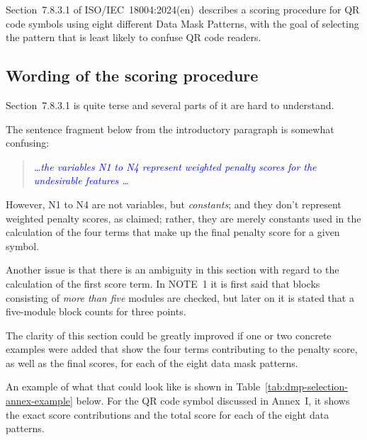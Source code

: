 \documentclass[a4paper,twoside]{article}
\newcommand{\shortstandard}{ISO/IEC~18004}
\newcommand{\standard}{\shortstandard:2024(en)}
\newcommand{\quotestandard}[1]{\textcolor{blue}{\textit{#1}}}
\newcommand{\ddd}{\dots}
\begin{document}
Section~7.8.3.1 of \standard\ describes a scoring procedure for QR code symbols using eight different
Data Mask Patterns, with the goal of selecting the pattern that is least likely to confuse QR code readers.

\subsection{Wording of the scoring procedure}

Section~7.8.3.1 is quite terse and several parts of it are hard to understand.

The sentence fragment below from the introductory paragraph is somewhat confusing:

\begin{quote}
\quotestandard{\ddd the variables N1 to N4 represent weighted penalty scores for the undesirable features \ddd}
\end{quote}

However, N1 to N4 are not variables, but \emph{constants}; and they don't represent weighted penalty
scores, as claimed; rather, they are merely constants used in the calculation of the four terms that make
up the final penalty score for a given symbol.

Another issue is that there is an ambiguity in this section with regard to the calculation of the first score term.
In NOTE~1 it is first said that blocks consisting of \emph{more than five} modules are checked, but later on
it is stated that a five-module block counts for three points.

The clarity of this section could be greatly improved if one or two concrete examples were added that show the four
terms contributing to the penalty score, as well as the final scores, for each of the eight data mask patterns.

An example of what that could look like is shown in Table~\ref{tab:dmp-selection-annex-example} below.
For the QR code symbol discussed in Annex~I, it shows the exact score contributions and the total score for each
of the eight data patterns.
\end{document}
